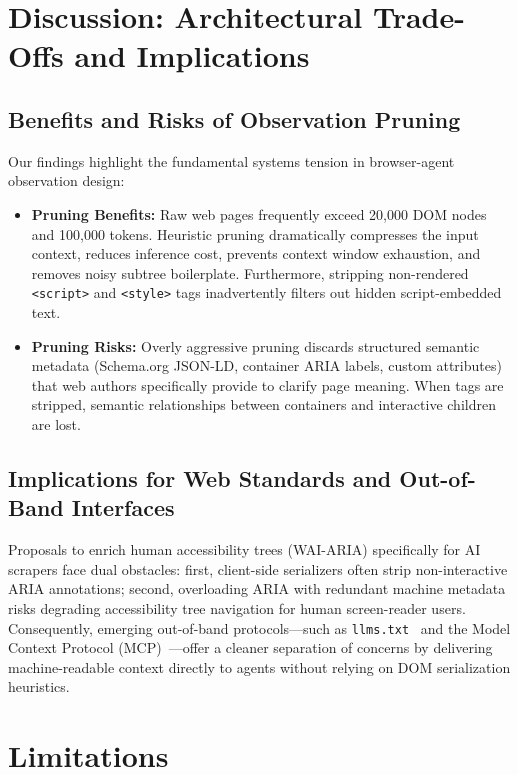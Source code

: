 \documentclass[11pt,a4paper]{article}
\begin{document}
\section{Discussion: Architectural Trade-Offs and Implications}
\label{sec:discussion}

\subsection{Benefits and Risks of Observation Pruning}
Our findings highlight the fundamental systems tension in browser-agent observation design:
\begin{itemize}
    \item \textbf{Pruning Benefits:} Raw web pages frequently exceed 20,000 DOM nodes and 100,000 tokens. Heuristic pruning dramatically compresses the input context, reduces inference cost, prevents context window exhaustion, and removes noisy subtree boilerplate. Furthermore, stripping non-rendered \texttt{<script>} and \texttt{<style>} tags inadvertently filters out hidden script-embedded text.
    \item \textbf{Pruning Risks:} Overly aggressive pruning discards structured semantic metadata (Schema.org JSON-LD, container ARIA labels, custom attributes) that web authors specifically provide to clarify page meaning. When tags are stripped, semantic relationships between containers and interactive children are lost.
\end{itemize}

\subsection{Implications for Web Standards and Out-of-Band Interfaces}
Proposals to enrich human accessibility trees (WAI-ARIA) specifically for AI scrapers face dual obstacles: first, client-side serializers often strip non-interactive ARIA annotations; second, overloading ARIA with redundant machine metadata risks degrading accessibility tree navigation for human screen-reader users. Consequently, emerging out-of-band protocols---such as \texttt{llms.txt}~\cite{llmstxt2024} and the Model Context Protocol (MCP)~\cite{mcp2024}---offer a cleaner separation of concerns by delivering machine-readable context directly to agents without relying on DOM serialization heuristics.

\section{Limitations}
\label{sec:limitations}
\end{document}
